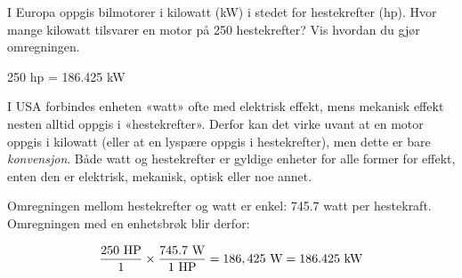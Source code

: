 
I Europa oppgis bilmotorer i kilowatt (kW) i stedet for hestekrefter (hp). Hvor mange kilowatt tilsvarer en motor på 250 hestekrefter? Vis hvordan du gjør omregningen.







250 hp = 186.425 kW

\vskip 10pt

I USA forbindes enheten «watt» ofte med elektrisk effekt, mens mekanisk effekt nesten alltid oppgis i «hestekrefter». Derfor kan det virke uvant at en motor oppgis i kilowatt (eller at en lyspære oppgis i hestekrefter), men dette er bare {\it konvensjon}. Både watt og hestekrefter er gyldige enheter for alle former for effekt, enten den er elektrisk, mekanisk, optisk eller noe annet.

Omregningen mellom hestekrefter og watt er enkel: 745.7 watt per hestekraft. Omregningen med en enhetsbrøk blir derfor:

$${250 \hbox{ HP} \over 1} \times {745.7 \hbox{ W} \over 1 \hbox{ HP}} = 186,425 \hbox{ W} = 186.425 \hbox{ kW}$$









